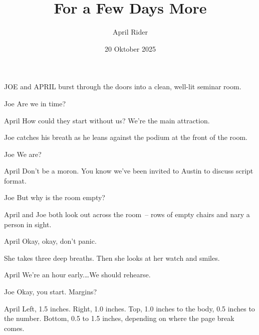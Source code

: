 \documentclass{musikal}[2025/10/20]
\title{For a Few Days More}
\author{April Rider}
\date{20 Oktober 2025}
\begin{document}
\coverpage
{}

JOE and APRIL burst through the doors into a clean, well-lit seminar room.

\begin{dialogue}{Joe}
    Are we in time?
\end{dialogue}

\begin{dialogue}{April}
    How could they start without us?
    We're the main attraction.
\end{dialogue}

Joe catches his breath as he leans against the podium at the front of the room.

\begin{dialogue}{Joe}
    We are?
\end{dialogue}

\begin{dialogue}{April}
    Don't be a moron.  You know we've
    been invited to Austin to discuss
    script format.
\end{dialogue}

\begin{dialogue}{Joe}
    But why is the room empty?
\end{dialogue}

April and Joe both look out across the room~-- rows of empty chairs and nary a person in sight.

\begin{dialogue}{April}
    Okay, okay, don't panic.
\end{dialogue}

She takes three deep breaths.  Then she looks at her watch
and smiles.

\begin{dialogue}[continuing]{April}
    We're an hour early.\dots  We should
    rehearse.
\end{dialogue}

\begin{dialogue}{Joe}
    Okay, you start.  Margins?
\end{dialogue}

\begin{dialogue}{April}
    Left, 1.5 inches.  Right, 1.0
    inches.  Top, 1.0 inches to the
    body, 0.5 inches to the number.
    Bottom, 0.5 to 1.5 inches,
    depending on where the page break
    comes.
\end{dialogue}

\scenecont
\end{document}
